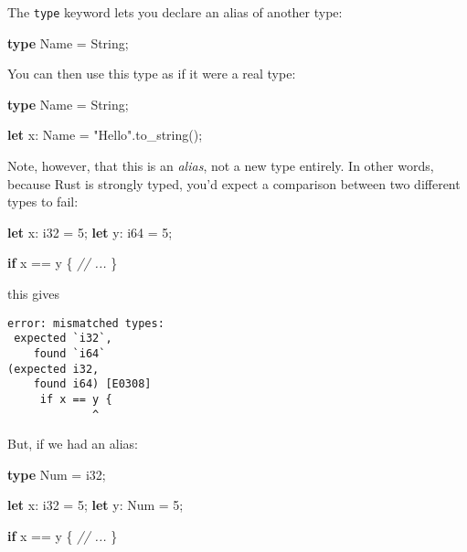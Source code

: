 \documentclass[a4paper,]{book}
\newenvironment{Shaded}{\begin{snugshade}}{\end{snugshade}}
\newcommand{\KeywordTok}[1]{\textcolor[rgb]{0.13,0.29,0.53}{\textbf{{#1}}}}
\newcommand{\DataTypeTok}[1]{\textcolor[rgb]{0.13,0.29,0.53}{{#1}}}
\newcommand{\DecValTok}[1]{\textcolor[rgb]{0.00,0.00,0.81}{{#1}}}
\newcommand{\StringTok}[1]{\textcolor[rgb]{0.31,0.60,0.02}{{#1}}}
\newcommand{\CommentTok}[1]{\textcolor[rgb]{0.56,0.35,0.01}{\textit{{#1}}}}
\newcommand{\NormalTok}[1]{{#1}}
\begin{document}
The \texttt{type} keyword lets you declare an alias of another type:

\begin{Shaded}
\begin{Highlighting}[]
\KeywordTok{type} \NormalTok{Name = }\DataTypeTok{String}\NormalTok{;}
\end{Highlighting}
\end{Shaded}

You can then use this type as if it were a real type:

\begin{Shaded}
\begin{Highlighting}[]
\KeywordTok{type} \NormalTok{Name = }\DataTypeTok{String}\NormalTok{;}

\KeywordTok{let} \NormalTok{x: Name = }\StringTok{"Hello"}\NormalTok{.to_string();}
\end{Highlighting}
\end{Shaded}

Note, however, that this is an \emph{alias}, not a new type entirely. In
other words, because Rust is strongly typed, you'd expect a comparison
between two different types to fail:

\begin{Shaded}
\begin{Highlighting}[]
\KeywordTok{let} \NormalTok{x: }\DataTypeTok{i32} \NormalTok{= }\DecValTok{5}\NormalTok{;}
\KeywordTok{let} \NormalTok{y: }\DataTypeTok{i64} \NormalTok{= }\DecValTok{5}\NormalTok{;}

\KeywordTok{if} \NormalTok{x == y \{}
   \CommentTok{// ...}
\NormalTok{\}}
\end{Highlighting}
\end{Shaded}

this gives

\begin{verbatim}
error: mismatched types:
 expected `i32`,
    found `i64`
(expected i32,
    found i64) [E0308]
     if x == y {
             ^
\end{verbatim}

But, if we had an alias:

\begin{Shaded}
\begin{Highlighting}[]
\KeywordTok{type} \NormalTok{Num = }\DataTypeTok{i32}\NormalTok{;}

\KeywordTok{let} \NormalTok{x: }\DataTypeTok{i32} \NormalTok{= }\DecValTok{5}\NormalTok{;}
\KeywordTok{let} \NormalTok{y: Num = }\DecValTok{5}\NormalTok{;}

\KeywordTok{if} \NormalTok{x == y \{}
   \CommentTok{// ...}
\NormalTok{\}}
\end{Highlighting}
\end{Shaded}
\end{document}

